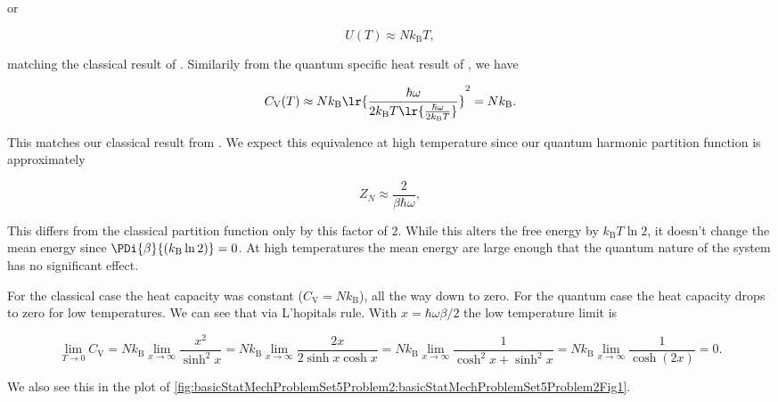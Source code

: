 {or

\begin{equation}\label{eqn:basicStatMechProblemSet5Problem2:400}
U(T) \approx N k_{\mathrm{B}} T,
\end{equation}

matching the classical result of .  Similarily from the quantum specific heat result of , we have

\begin{equation}\label{eqn:basicStatMechProblemSet5Problem2:420}
C_{\mathrm{V}}(T) \approx
N k_{\mathrm{B}}
\lr{\frac{\hbar \omega}{2 k_{\mathrm{B}} T
\lr{ \frac{\hbar \omega}{2 k_{\mathrm{B}} T}}
} }^2
= N k_{\mathrm{B}}.
\end{equation}

This matches our classical result from .  We expect this equivalence at high temperature since our quantum harmonic partition function  is approximately

\begin{equation}\label{eqn:basicStatMechProblemSet5Problem2:440}
Z_N \approx \frac{2}{\beta \hbar \omega},
\end{equation}

This differs from the classical partition function only by this factor of $2$.  While this alters the free energy by $k_{\mathrm{B}} T \ln 2$, it doesn't change the mean energy since $\PDi{\beta}{(k_{\mathrm{B}} \ln 2)} = 0$.  At high temperatures the mean energy are large enough that the quantum nature of the system has no significant effect.


For the classical case the heat capacity was constant ($C_{\mathrm{V}} = N k_{\mathrm{B}}$), all the way down to zero.  For the quantum case the heat capacity drops to zero for low temperatures.  We can see that via L'hopitals rule.  With $x = \hbar \omega \beta/2$ the low temperature limit is

\begin{dmath}\label{eqn:basicStatMechProblemSet5Problem2:460}
\lim_{T \rightarrow 0} C_{\mathrm{V}} 
= N k_{\mathrm{B}} \lim_{x \rightarrow \infty} 
\frac{x^2}{\sinh^2 x}
= N k_{\mathrm{B}} \lim_{x \rightarrow \infty} 
\frac{2x }{2 \sinh x \cosh x}
= N k_{\mathrm{B}} \lim_{x \rightarrow \infty} 
\frac{1 }{\cosh^2 x + \sinh^2 x}
= N k_{\mathrm{B}} \lim_{x \rightarrow \infty} 
\frac{1 }{\cosh (2 x) }
= 0.
\end{dmath}

We also see this in the plot of \cref{fig:basicStatMechProblemSet5Problem2:basicStatMechProblemSet5Problem2Fig1}.

}
